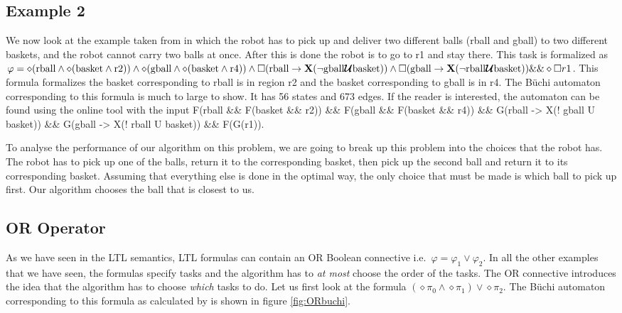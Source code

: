 \subsection{Example 2}
We now look at the example taken from \cite{guo15} in which the robot has to pick up and deliver two different balls (rball and gball) to two different baskets, and the robot cannot carry two balls at once. After this is done the robot is to go to r1 and stay there. This task is formalized as $\varphi = \diamond (\text{rball} \wedge \diamond (\text{basket} \wedge \text{r2})) \wedge \diamond(\text{gball} \wedge \diamond (\text{basket} \wedge \text{r4})) \wedge \square (\text{rball} \rightarrow \textbf{X}(\neg \text{gball} \bm{\mathcal{U}} \text{basket})) \wedge \square (\text{gball} \rightarrow \textbf{X} (\neg \text{rball} \bm{\mathcal{U}} \text{basket})) \&\& \diamond \square r1$. This formula formalizes the basket corresponding to rball is in region r2 and the basket corresponding to gball is in r4. The B\"uchi automaton corresponding to this formula is much to large to show. It has 56 states and 673 edges. If the reader is interested, the automaton can be found using the online tool \cite{ltlbuchiwebsite} with the input F(rball \&\& F(basket \&\& r2)) \&\& F(gball \&\& F(basket \&\& r4)) \&\& G(rball -> X(! gball U basket)) \&\& G(gball -> X(! rball U basket)) \&\& F(G(r1)). 

To analyse the performance of our algorithm on this problem, we are going to break up this problem into the choices that the robot has. The robot has to pick up one of the balls, return it to the corresponding basket, then pick up the second ball and return it to its corresponding basket. Assuming that everything else is done in the optimal way, the only choice that must be made is which ball to pick up first. Our algorithm chooses the ball that is closest to us. 

\subsection{OR Operator}
As we have seen in the LTL semantics, LTL formulas can contain an OR Boolean connective i.e.\ $\varphi = \varphi_1 \lor \varphi_2$. In all the other examples that we have seen, the formulas specify tasks and the algorithm has to \textit{at most} choose the order of the tasks. The OR connective introduces the idea that the algorithm has to choose \textit{which} tasks to do. Let us first look at the formula $(\diamond \pi_0 \wedge \diamond \pi_1 ) \lor \diamond \pi_2$.
The B\"uchi automaton corresponding to this formula as calculated by \cite{gastin01} is shown in figure \ref{fig:ORbuchi}.

